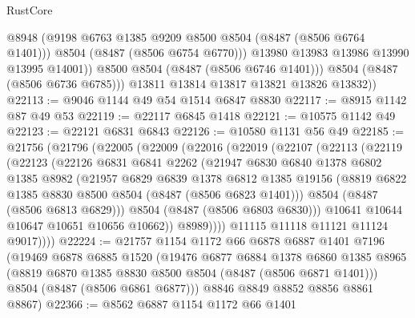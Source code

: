 \begin{lexlean}{RustCore}
\begin{coremodule}
                  @8948
                  (@9198 @6763 @1385 @9209 @8500 @8504 (@8487 (@8506 @6764 @1401)))
                  @8504
                  (@8487 (@8506 @6754 @6770)))
                @13980
                @13983
                @13986
                @13990
                @13995
                @14001))
            @8500
            @8504
            (@8487 (@8506 @6746 @1401)))
          @8504
          (@8487 (@8506 @6736 @6785)))
        @13811
        @13814
        @13817
        @13821
        @13826
        @13832))
@22113 := @9046 @1144 @49 @54 @1514 @6847 @8830
@22117 := @8915 @1142 @87 @49 @53
@22119 := @22117 @6845 @1418
@22121 := @10575 @1142 @49
@22123 := @22121 @6831 @6843
@22126 := @10580 @1131 @56 @49
@22185 := @21756
    (@21796
      (@22005
        (@22009
          (@22016
            (@22019
              (@22107
                (@22113
                  (@22119
                    (@22123
                      (@22126
                        @6831
                        @6841
                        @2262
                        (@21947
                          @6830
                          @6840
                          @1378
                          @6802
                          @1385
                          @8982
                          (@21957
                            @6829
                            @6839
                            @1378
                            @6812
                            @1385
                            @19156
                            (@8819 @6822 @1385 @8830 @8500 @8504 (@8487 (@8506 @6823 @1401)))
                            @8504
                            (@8487 (@8506 @6813 @6829)))
                          @8504
                          (@8487 (@8506 @6803 @6830)))
                        @10641
                        @10644
                        @10647
                        @10651
                        @10656
                        @10662))
                    @8989))))
            @11115
            @11118
            @11121
            @11124
            @9017))))
@22224 := @21757
    @1154
    @1172
    @66
    @6878
    @6887
    @1401
    @7196
    (@19469
      @6878
      @6885
      @1520
      (@19476
        @6877
        @6884
        @1378
        @6860
        @1385
        @8965
        (@8819 @6870 @1385 @8830 @8500 @8504 (@8487 (@8506 @6871 @1401)))
        @8504
        (@8487 (@8506 @6861 @6877)))
      @8846
      @8849
      @8852
      @8856
      @8861
      @8867)
@22366 := @8562
    @6887
    @1154
    @1172
    @66
    @1401

\end{coremodule}
\end{lexlean}
